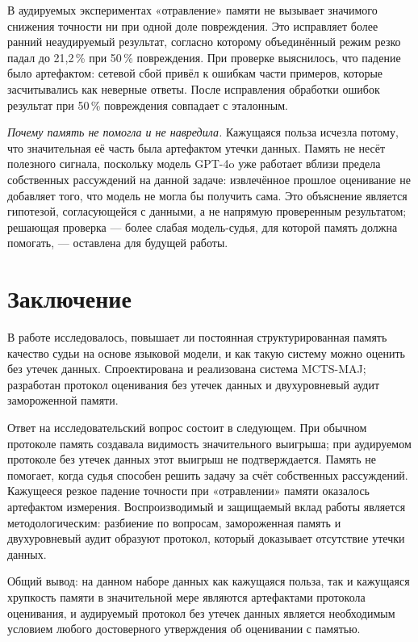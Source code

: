 \documentclass[14pt,a4paper]{extreport}
\begin{document}
В аудируемых экспериментах «отравление» памяти не вызывает значимого снижения точности ни при одной доле повреждения. Это исправляет более ранний неаудируемый результат, согласно которому объединённый режим резко падал до 21,2\,\% при 50\,\% повреждения. При проверке выяснилось, что падение было артефактом: сетевой сбой привёл к ошибкам части примеров, которые засчитывались как неверные ответы. После исправления обработки ошибок результат при 50\,\% повреждения совпадает с эталонным.

\emph{Почему память не помогла и не навредила.} Кажущаяся польза исчезла потому, что значительная её часть была артефактом утечки данных. Память не несёт полезного сигнала, поскольку модель GPT-4o уже работает вблизи предела собственных рассуждений на данной задаче: извлечённое прошлое оценивание не добавляет того, что модель не могла бы получить сама. Это объяснение является гипотезой, согласующейся с данными, а не напрямую проверенным результатом; решающая проверка — более слабая модель-судья, для которой память должна помогать, — оставлена для будущей работы.

\chapter{Заключение}

В работе исследовалось, повышает ли постоянная структурированная память качество судьи на основе языковой модели, и как такую систему можно оценить без утечек данных. Спроектирована и реализована система MCTS-MAJ; разработан протокол оценивания без утечек данных и двухуровневый аудит замороженной памяти.

Ответ на исследовательский вопрос состоит в следующем. При обычном протоколе память создавала видимость значительного выигрыша; при аудируемом протоколе без утечек данных этот выигрыш не подтверждается. Память не помогает, когда судья способен решить задачу за счёт собственных рассуждений. Кажущееся резкое падение точности при «отравлении» памяти оказалось артефактом измерения. Воспроизводимый и защищаемый вклад работы является методологическим: разбиение по вопросам, замороженная память и двухуровневый аудит образуют протокол, который доказывает отсутствие утечки данных.

Общий вывод: на данном наборе данных как кажущаяся польза, так и кажущаяся хрупкость памяти в значительной мере являются артефактами протокола оценивания, и аудируемый протокол без утечек данных является необходимым условием любого достоверного утверждения об оценивании с памятью.
\end{document}
